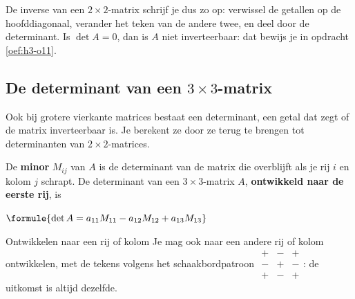 De inverse van een $2 \times 2$-matrix schrijf je dus zo op: verwissel de getallen op de hoofddiagonaal, verander het teken van de andere twee, en deel door de determinant. Is $\det A = 0$, dan is $A$ niet inverteerbaar: dat bewijs je in opdracht \ref{oef:h3-o11}.


\begin{oefeningen}
\end{oefeningen}

\subsection{De determinant van een \texorpdfstring{$3 \times 3$}{3x3}-matrix}

Ook bij grotere vierkante matrices bestaat een determinant, een getal dat zegt of de matrix inverteerbaar is. Je berekent ze door ze terug te brengen tot determinanten van $2 \times 2$-matrices.

\begin{theorie}
De \textbf{\textcolor{accent}{minor}} $M_{ij}$ van $A$ is de determinant van de matrix die overblijft als je rij $i$ en kolom $j$ schrapt. De determinant van een $3 \times 3$-matrix $A$, \textbf{\textcolor{accent}{ontwikkeld naar de eerste rij}}, is

\vspace{1mm}
\qquad $\formule{\det A = a_{11}M_{11} - a_{12}M_{12} + a_{13}M_{13}}$

\begin{stelling}{Ontwikkelen naar een rij of kolom}
Je mag ook naar een andere rij of kolom ontwikkelen, met de tekens volgens het schaakbordpatroon $\begin{smallmatrix} + & - & + \\ - & + & - \\ + & - & + \end{smallmatrix}$: de uitkomst is altijd dezelfde.
\end{stelling}
\end{theorie}

